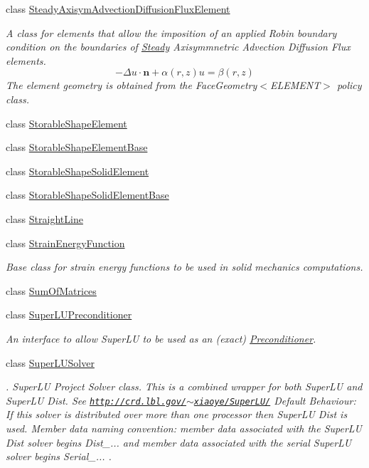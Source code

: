 \begin{DoxyCompactItemize}
class \hyperlink{classoomph_1_1SteadyAxisymAdvectionDiffusionFluxElement}{Steady\+Axisym\+Advection\+Diffusion\+Flux\+Element}
\begin{DoxyCompactList}\small\item\em A class for elements that allow the imposition of an applied Robin boundary condition on the boundaries of \hyperlink{classoomph_1_1Steady}{Steady} Axisymmnetric Advection Diffusion Flux elements. \[ -\Delta u \cdot \mathbf{n} + \alpha(r,z) u = \beta(r,z) \] The element geometry is obtained from the Face\+Geometry$<$\+E\+L\+E\+M\+E\+N\+T$>$ policy class. \end{DoxyCompactList}\item 
class \hyperlink{classoomph_1_1StorableShapeElement}{Storable\+Shape\+Element}
\item 
class \hyperlink{classoomph_1_1StorableShapeElementBase}{Storable\+Shape\+Element\+Base}
\item 
class \hyperlink{classoomph_1_1StorableShapeSolidElement}{Storable\+Shape\+Solid\+Element}
\item 
class \hyperlink{classoomph_1_1StorableShapeSolidElementBase}{Storable\+Shape\+Solid\+Element\+Base}
\item 
class \hyperlink{classoomph_1_1StraightLine}{Straight\+Line}
\item 
class \hyperlink{classoomph_1_1StrainEnergyFunction}{Strain\+Energy\+Function}
\begin{DoxyCompactList}\small\item\em Base class for strain energy functions to be used in solid mechanics computations. \end{DoxyCompactList}\item 
class \hyperlink{classoomph_1_1SumOfMatrices}{Sum\+Of\+Matrices}
\item 
class \hyperlink{classoomph_1_1SuperLUPreconditioner}{Super\+L\+U\+Preconditioner}
\begin{DoxyCompactList}\small\item\em An interface to allow Super\+LU to be used as an (exact) \hyperlink{classoomph_1_1Preconditioner}{Preconditioner}. \end{DoxyCompactList}\item 
class \hyperlink{classoomph_1_1SuperLUSolver}{Super\+L\+U\+Solver}
\begin{DoxyCompactList}\small\item\em . Super\+LU Project Solver class. This is a combined wrapper for both Super\+LU and Super\+LU Dist. See \href{http://crd.lbl.gov/~xiaoye/SuperLU/}{\tt http\+://crd.\+lbl.\+gov/$\sim$xiaoye/\+Super\+L\+U/} Default Behaviour\+: If this solver is distributed over more than one processor then Super\+LU Dist is used. Member data naming convention\+: member data associated with the Super\+LU Dist solver begins Dist\+\_\+... and member data associated with the serial Super\+LU solver begins Serial\+\_\+... . \end{DoxyCompactList}\item 

\end{DoxyCompactItemize}
